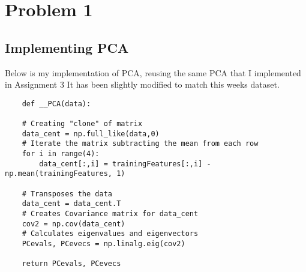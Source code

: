 \section{Problem 1}
\subsection{Implementing PCA}

Below is my implementation of PCA, reusing the same PCA that I implemented in Assignment 3
It has been slightly modified to match this weeks dataset.
\begin{verbatim}
    def __PCA(data):
    
    # Creating "clone" of matrix
    data_cent = np.full_like(data,0) 
    # Iterate the matrix subtracting the mean from each row
    for i in range(4):
        data_cent[:,i] = trainingFeatures[:,i] - np.mean(trainingFeatures, 1)

    # Transposes the data
    data_cent = data_cent.T
    # Creates Covariance matrix for data_cent
    cov2 = np.cov(data_cent)
    # Calculates eigenvalues and eigenvectors
    PCevals, PCevecs = np.linalg.eig(cov2)

    return PCevals, PCevecs
\end{verbatim}


\newpage